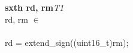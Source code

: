 


\begin{instructionblock}{\imagewidth}%
    \textbf{sxth rd, rm}\hfill\textit{T1}\\
    rd, rm $\in$ \baseregisters\\
    {}\\
    rd = extend\_sign((uint16\_t)rm);
\end{instructionblock}

